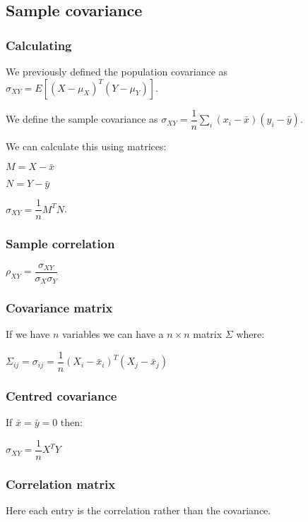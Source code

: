 
\subsection{Sample covariance}

\subsubsection{Calculating}

We previously defined the population covariance as \(\sigma_{XY}=E[(X-\mu_X)^T(Y-\mu_Y)]\).

We define the sample covariance as \(\sigma_{XY}=\dfrac{1}{n}\sum_i(x_i-\bar x)(y_i-\bar y)\).

We can calculate this using matrices:

\(M=X-\bar x\)

\(N=Y-\bar y\)

\(\sigma_{XY}=\dfrac{1}{n}M^TN\).

\subsubsection{Sample correlation}

\(\rho_{XY}=\dfrac{\sigma_{XY}}{\sigma_X \sigma_Y}\)

\subsubsection{Covariance matrix}

If we have \(n\) variables we can have a \(n\times n \) matrix \(\Sigma \) where:

\(\Sigma_{ij} = \sigma_{ij}=\dfrac{1}{n}(X_i-\bar x_i)^T(X_j-\bar x_j)\)

\subsubsection{Centred covariance}

If \(\bar x = \bar y = 0\) then:

\(\sigma_{XY}=\dfrac{1}{n}X^TY\)

\subsubsection{Correlation matrix}

Here each entry is the correlation rather than the covariance.

